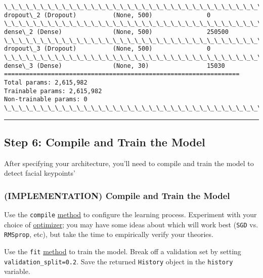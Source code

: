 \documentclass[11pt]{article}
\begin{document}
\begin{Verbatim}[commandchars=\\\{\}]
\_\_\_\_\_\_\_\_\_\_\_\_\_\_\_\_\_\_\_\_\_\_\_\_\_\_\_\_\_\_\_\_\_\_\_\_\_\_\_\_\_\_\_\_\_\_\_\_\_\_\_\_\_\_\_\_\_\_\_\_\_\_\_\_\_
dropout\_2 (Dropout)          (None, 500)               0         
\_\_\_\_\_\_\_\_\_\_\_\_\_\_\_\_\_\_\_\_\_\_\_\_\_\_\_\_\_\_\_\_\_\_\_\_\_\_\_\_\_\_\_\_\_\_\_\_\_\_\_\_\_\_\_\_\_\_\_\_\_\_\_\_\_
dense\_2 (Dense)              (None, 500)               250500    
\_\_\_\_\_\_\_\_\_\_\_\_\_\_\_\_\_\_\_\_\_\_\_\_\_\_\_\_\_\_\_\_\_\_\_\_\_\_\_\_\_\_\_\_\_\_\_\_\_\_\_\_\_\_\_\_\_\_\_\_\_\_\_\_\_
dropout\_3 (Dropout)          (None, 500)               0         
\_\_\_\_\_\_\_\_\_\_\_\_\_\_\_\_\_\_\_\_\_\_\_\_\_\_\_\_\_\_\_\_\_\_\_\_\_\_\_\_\_\_\_\_\_\_\_\_\_\_\_\_\_\_\_\_\_\_\_\_\_\_\_\_\_
dense\_3 (Dense)              (None, 30)                15030     
=================================================================
Total params: 2,615,982
Trainable params: 2,615,982
Non-trainable params: 0
\_\_\_\_\_\_\_\_\_\_\_\_\_\_\_\_\_\_\_\_\_\_\_\_\_\_\_\_\_\_\_\_\_\_\_\_\_\_\_\_\_\_\_\_\_\_\_\_\_\_\_\_\_\_\_\_\_\_\_\_\_\_\_\_\_

    \end{Verbatim}

    \begin{center}\rule{0.5\linewidth}{\linethickness}\end{center}

\subsection{Step 6: Compile and Train the
Model}\label{step-6-compile-and-train-the-model}

After specifying your architecture, you'll need to compile and train the
model to detect facial keypoints'

    \subsubsection{(IMPLEMENTATION) Compile and Train the
Model}\label{implementation-compile-and-train-the-model}

Use the \texttt{compile}
\href{https://keras.io/models/sequential/\#sequential-model-methods}{method}
to configure the learning process. Experiment with your choice of
\href{https://keras.io/optimizers/}{optimizer}; you may have some ideas
about which will work best (\texttt{SGD} vs. \texttt{RMSprop}, etc), but
take the time to empirically verify your theories.

Use the \texttt{fit}
\href{https://keras.io/models/sequential/\#sequential-model-methods}{method}
to train the model. Break off a validation set by setting
\texttt{validation\_split=0.2}. Save the returned \texttt{History}
object in the \texttt{history} variable.
\end{document}
